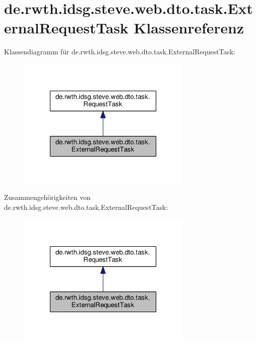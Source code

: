 \hypertarget{classde_1_1rwth_1_1idsg_1_1steve_1_1web_1_1dto_1_1task_1_1_external_request_task}{\section{de.\-rwth.\-idsg.\-steve.\-web.\-dto.\-task.\-External\-Request\-Task Klassenreferenz}
\label{classde_1_1rwth_1_1idsg_1_1steve_1_1web_1_1dto_1_1task_1_1_external_request_task}
}


Klassendiagramm für de.\-rwth.\-idsg.\-steve.\-web.\-dto.\-task.\-External\-Request\-Task\-:\nopagebreak
\begin{figure}[H]
\begin{center}
\leavevmode
\includegraphics[width=238pt]{classde_1_1rwth_1_1idsg_1_1steve_1_1web_1_1dto_1_1task_1_1_external_request_task__inherit__graph}
\end{center}
\end{figure}


Zusammengehörigkeiten von de.\-rwth.\-idsg.\-steve.\-web.\-dto.\-task.\-External\-Request\-Task\-:\nopagebreak
\begin{figure}[H]
\begin{center}
\leavevmode
\includegraphics[width=238pt]{classde_1_1rwth_1_1idsg_1_1steve_1_1web_1_1dto_1_1task_1_1_external_request_task__coll__graph}
\end{center}
\end{figure}
